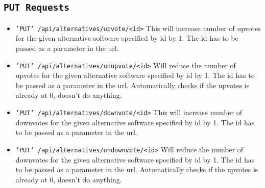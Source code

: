 \subsection{\texttt{PUT Requests}}

\begin{itemize}

\item{\texttt{'PUT' /api/alternatives/upvote/<id>}}
This will increase number of upvotes for the given alternative software specified by id by 1. The id has to be passed as a parameter in the url.


\item{\texttt{'PUT' /api/alternatives/unupvote/<id>}}
Will reduce the number of upvotes for the given alternative software specified by id by 1. The id has to be passed as a parameter in the url. Automatically checks if the upvotes is already at 0, doesn’t do anything.


\item{\texttt{'PUT' /api/alternatives/downvote/<id>}}
This will increase number of downvotes for the given alternative software specified by id by 1. The id has to be passed as a parameter in the url.


\item{\texttt{'PUT' /api/alternatives/undownvote/<id>}}
Will reduce the number of downvotes for the given alternative software specified by id by 1. The id has to be passed as a parameter in the url. Automatically checks if the upvotes is already at 0, doesn’t do anything.

\end{itemize}



